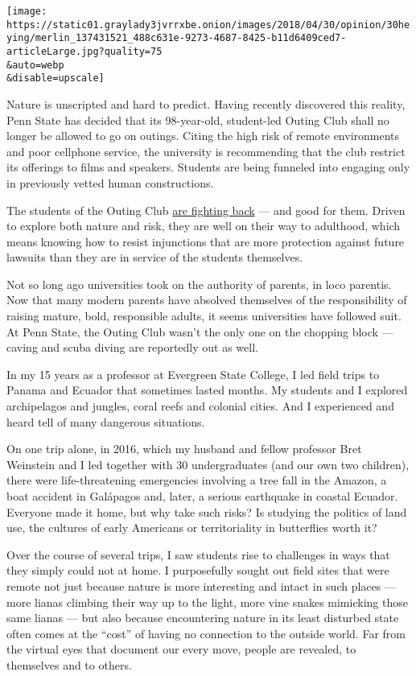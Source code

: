 \texttt{[image: https://static01.graylady3jvrrxbe.onion/images/2018/04/30/opinion/30heying/merlin\_137431521\_488c631e-9273-4687-8425-b11d6409ced7-articleLarge.jpg?quality=75\\\&auto=webp\\\&disable=upscale]}

Nature is unscripted and hard to predict. Having recently discovered
this reality, Penn State has decided that its 98-year-old, student-led
Outing Club shall no longer be allowed to go on outings. Citing the high
risk of remote environments and poor cellphone service, the university
is recommending that the club restrict its offerings to films and
speakers. Students are being funneled into engaging only in previously
vetted human constructions.

The students of the Outing Club
\href{http://sites.psu.edu/outingclub/}{are fighting back} --- and good
for them. Driven to explore both nature and risk, they are well on their
way to adulthood, which means knowing how to resist injunctions that are
more protection against future lawsuits than they are in service of the
students themselves.

Not so long ago universities took on the authority of parents, in loco
parentis. Now that many modern parents have absolved themselves of the
responsibility of raising mature, bold, responsible adults, it seems
universities have followed suit. At Penn State, the Outing Club wasn't
the only one on the chopping block --- caving and scuba diving are
reportedly out as well.

\begin{quote}
\end{quote}

In my 15 years as a professor at Evergreen State College, I led field
trips to Panama and Ecuador that sometimes lasted months. My students
and I explored archipelagos and jungles, coral reefs and colonial
cities. And I experienced and heard tell of many dangerous situations.

On one trip alone, in 2016, which my husband and fellow professor Bret
Weinstein and I led together with 30 undergraduates (and our own two
children), there were life-threatening emergencies involving a tree fall
in the Amazon, a boat accident in Galápagos and, later, a serious
earthquake in coastal Ecuador. Everyone made it home, but why take such
risks? Is studying the politics of land use, the cultures of early
Americans or territoriality in butterflies worth it?

Over the course of several trips, I saw students rise to challenges in
ways that they simply could not at home. I purposefully sought out field
sites that were remote not just because nature is more interesting and
intact in such places --- more lianas climbing their way up to the
light, more vine snakes mimicking those same lianas --- but also because
encountering nature in its least disturbed state often comes at the
``cost'' of having no connection to the outside world. Far from the
virtual eyes that document our every move, people are revealed, to
themselves and to others.

